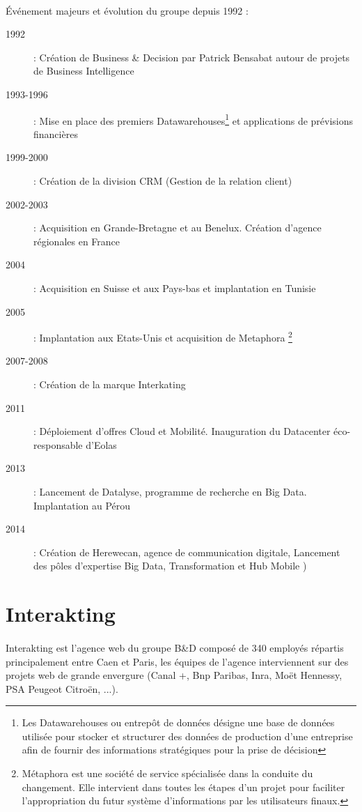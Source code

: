         \paragraph{}
       	  Événement majeurs et évolution du groupe depuis 1992 : 
       	  \begin{description}
       	  \item[1992] : Création de Business \& Decision par Patrick Bensabat autour de projets de Business Intelligence
       	  \item[1993-1996] : Mise en place des premiers Datawarehouses\footnote{Les Datawarehouses ou entrepôt de données désigne une base de données utilisée pour stocker et structurer des données de production d'une entreprise afin de fournir des informations stratégiques pour la prise de décision} et applications de prévisions financières
       	  \item[1999-2000] : Création de la division CRM (Gestion de la relation client)
       	  \item[2002-2003] : Acquisition en Grande-Bretagne et au Benelux. Création d'agence régionales en France
       	  \item[2004] : Acquisition en Suisse et aux Pays-bas et implantation en Tunisie
       	  \item[2005] : Implantation aux Etats-Unis et acquisition de Metaphora \footnote{Métaphora est une société de service spécialisée dans la conduite du changement. Elle intervient dans toutes les étapes d’un projet pour faciliter l’appropriation du futur système d’informations par les utilisateurs finaux.}
       	  \item[2007-2008] : Création de la marque Interkating
       	  \item[2011] : Déploiement d'offres Cloud et Mobilité. Inauguration du Datacenter éco-responsable d'Eolas
       	  \item[2013] : Lancement de Datalyse, programme de recherche en Big Data. Implantation au Pérou
       	  \item[2014] : Création de Herewecan, agence de communication digitale, Lancement des pôles d'expertise Big Data, Transformation et Hub Mobile )
       	  \end{description}
       	  
\section{Interakting}

        \paragraph{}
        Interakting est l'agence web du groupe B\&D  composé de 340 employés répartis principalement entre Caen et Paris, les équipes de l'agence interviennent sur des projets web  de grande envergure (Canal +, Bnp Paribas, Inra, Moët Hennessy, PSA Peugeot Citroën, ...).
        
